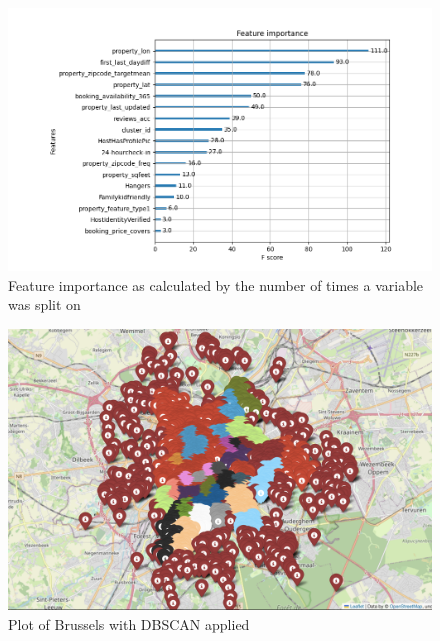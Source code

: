 \documentclass[11pt, oneside]{article}   	%
\begin{document}
\begin{figure}[h!]
\centering
	\includegraphics[width=1\linewidth]{FI_final}
\caption{Feature importance as calculated by the number of times a variable was split on}
\label{figure label}
\end{figure}

\begin{figure}[h]

\centering
	\includegraphics[width=1\linewidth]{densityClusters.png}
\caption{Plot of Brussels with DBSCAN applied}
\label{figure label}
\end{figure}
\end{document}
